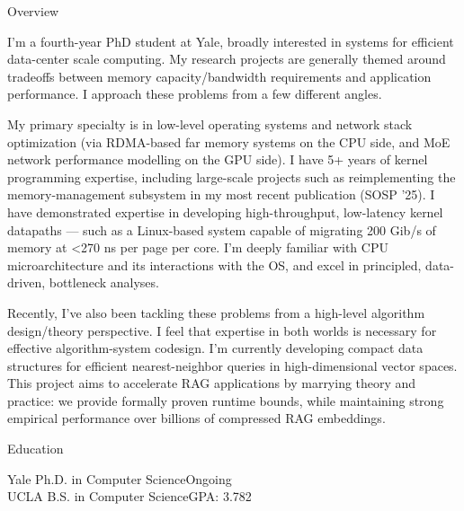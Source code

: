 \documentclass{resume} %
\begin{document}
\begin{resumeSection}{Overview}




I'm a fourth-year PhD student at Yale, broadly interested in systems for efficient data-center scale computing. 
My research projects are generally themed around tradeoffs between memory capacity/bandwidth requirements and application performance. 
I approach these problems from a few different angles. 

My primary specialty is in low-level operating systems and network stack optimization (via RDMA-based far memory systems on the CPU side, and MoE network performance modelling on the GPU side). 
I have 5+ years of kernel programming expertise, including large-scale projects such as reimplementing the memory-management subsystem in my most recent publication (SOSP '25). 
I have demonstrated expertise in developing high-throughput, low-latency kernel datapaths --- such as a Linux-based system capable of migrating 200 Gib/s of memory at \textless 270 ns per page per core.
I'm deeply familiar with CPU microarchitecture and its interactions with the OS, and excel in principled, data-driven, bottleneck analyses. 

Recently, I've also been tackling these problems from a high-level algorithm design/theory perspective.  
I feel that expertise in both worlds is necessary for effective algorithm-system codesign. 
I'm currently developing compact data structures for efficient nearest-neighbor queries in high-dimensional vector spaces. 
This project aims to accelerate RAG applications by marrying theory and practice: we provide formally proven runtime bounds, while maintaining strong empirical performance over billions of compressed RAG embeddings. 

\end{resumeSection}

\begin{resumeSection}{Education}

Yale Ph.D. in Computer Science\hfill Ongoing \\
UCLA B.S. in Computer Science\hfill GPA: 3.782

\end{resumeSection}
\end{document}
